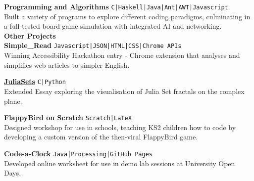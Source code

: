 \documentclass[10pt]{article}
\newcommand{\sect}[1]{{\LARGE{\textbf{#1}}}\vspace{0.1em}\\}
\newcommand{\zz}[3]{{\large\textbf{#1}} \hfill {\small \colorbox{boxcol}{\texttt{#3}} }\\{#2}\vspace{0.5em}}
\newcommand{\li}{\textcolor{linecol}{|}}
\begin{document}
\begin{minipage}[t]{0.7\textwidth}
\zz{Programming and Algorithms}{Built a variety of programs to explore different coding paradigms, culminating in a full-tested board game simulation with integrated AI and networking.}{C\li Haskell\li Java\li Ant\li AWT\li Javascript}
\\

\sect{Other Projects}
\zz{\href{https://github.com/LukeStorry/simple_read}{}Simple\_Read}
{Winning Accessibility Hackathon entry - Chrome extension that analyses and simplifies web articles to simpler English.}{Javascript\li JSON\li HTML\li CSS\li Chrome APIs}

\zz{\href{https://github.com/LukeStorry/Juliasets}{JuliaSets}}{Extended Essay exploring the visualisation of Julia Set fractals on the complex plane.}{C\li Python}

\zz{FlappyBird on Scratch}{Designed workshop for use in schools, teaching KS2 children how to code by developing a custom version of the then-viral FlappyBird game.}{Scratch\li \LaTeX}

\zz{Code-a-Clock}{Developed online worksheet for use in demo lab sessions at University Open Days.}{Java\li Processing\li GitHub Pages}


\end{minipage} 
\end{document}
